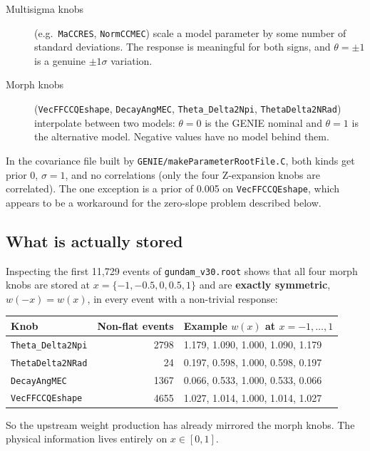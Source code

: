\documentclass[11pt]{article}
\newcommand{\code}[1]{\texttt{#1}}
\begin{document}
\begin{description}
  \item[Multisigma knobs] (e.g.\ \code{MaCCRES}, \code{NormCCMEC}) scale a model
    parameter by some number of standard deviations. The response is meaningful
    for both signs, and $\theta=\pm1$ is a genuine $\pm1\sigma$ variation.
  \item[Morph knobs] (\code{VecFFCCQEshape}, \code{DecayAngMEC},
    \code{Theta\_Delta2Npi}, \code{ThetaDelta2NRad}) interpolate between two
    models: $\theta=0$ is the GENIE nominal and $\theta=1$ is the alternative
    model. Negative values have no model behind them.
\end{description}

In the covariance file built by
\code{GENIE/makeParameterRootFile.C}, both kinds get prior 0, $\sigma=1$, and no
correlations (only the four Z-expansion knobs are correlated). The one
exception is a prior of 0.005 on \code{VecFFCCQEshape}, which appears to be a
workaround for the zero-slope problem described below.

\subsection{What is actually stored}

Inspecting the first 11{,}729 events of \code{gundam\_v30.root} shows that all four
morph knobs are stored at $x = \{-1,-0.5,0,0.5,1\}$ and are \textbf{exactly
symmetric}, $w(-x)=w(x)$, in every event with a non-trivial response:

\begin{center}
\begin{tabular}{@{}lrl@{}}
\toprule
Knob & Non-flat events & Example $w(x)$ at $x=-1,\dots,1$ \\
\midrule
\code{Theta\_Delta2Npi} & 2798 & 1.179, 1.090, 1.000, 1.090, 1.179 \\
\code{ThetaDelta2NRad}  & 24   & 0.197, 0.598, 1.000, 0.598, 0.197 \\
\code{DecayAngMEC}      & 1367 & 0.066, 0.533, 1.000, 0.533, 0.066 \\
\code{VecFFCCQEshape}   & 4655 & 1.027, 1.014, 1.000, 1.014, 1.027 \\
\bottomrule
\end{tabular}
\end{center}

So the upstream weight production has already mirrored the morph knobs. The
physical information lives entirely on $x\in[0,1]$.
\end{document}

